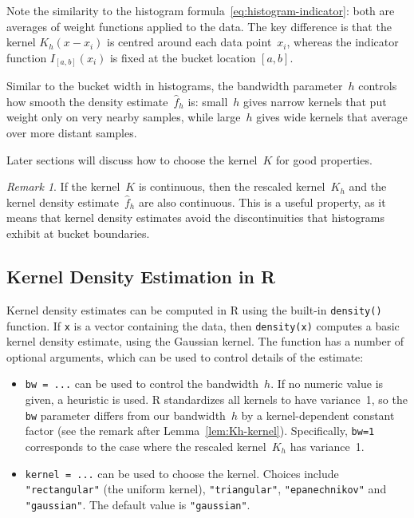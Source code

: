 \documentclass[
  a4paper,
]{article}
\theoremstyle{definition}
\theoremstyle{definition}
\theoremstyle{definition}
\theoremstyle{definition}
\theoremstyle{remark}
\newtheorem*{remark}{Remark}
\begin{document}
Note the similarity to the histogram formula~\eqref{eq:histogram-indicator}:
both are averages of weight functions applied to the data.
The key difference is that the kernel \(K_h(x - x_i)\) is centred around each
data point~\(x_i\), whereas the indicator function \(I_{[a,b]}(x_i)\) is fixed
at the bucket location \([a,b]\).

Similar to the bucket width in histograms, the bandwidth parameter~\(h\)
controls how smooth the density estimate~\(\hat f_h\) is: small~\(h\) gives
narrow kernels that put weight only on very nearby samples, while large~\(h\)
gives wide kernels that average over more distant samples.

Later sections will discuss how to choose the kernel~\(K\) for good properties.

\begin{remark}
If the kernel~\(K\) is continuous, then the rescaled kernel~\(K_h\) and the
kernel density estimate~\(\hat f_h\) are also continuous. This is a useful
property, as it means that kernel density estimates avoid the discontinuities
that histograms exhibit at bucket boundaries.
\end{remark}

\subsection{Kernel Density Estimation in R}\label{kernel-density-estimation-in-r}

Kernel density estimates can be computed in R using the built-in
\texttt{density()} function. If \texttt{x} is a vector containing the data, then
\texttt{density(x)} computes a basic kernel density estimate, using the
Gaussian kernel. The function has a number of optional arguments,
which can be used to control details of the estimate:

\begin{itemize}
\item
  \texttt{bw\ =\ ...} can be used to control the bandwidth~\(h\).
  If no numeric value is given, a heuristic is used.
  R standardizes all kernels to have variance~1, so the \texttt{bw}
  parameter differs from our bandwidth~\(h\) by a kernel-dependent
  constant factor (see the remark after Lemma~\ref{lem:Kh-kernel}).
  Specifically, \texttt{bw=1} corresponds to the case where the rescaled
  kernel~\(K_h\) has variance~1.
\item
  \texttt{kernel\ =\ ...} can be used to choose the kernel.
  Choices include \texttt{"rectangular"} (the uniform kernel), \texttt{"triangular"},
  \texttt{"epanechnikov"} and \texttt{"gaussian"}. The default value is \texttt{"gaussian"}.
\end{itemize}
\end{document}
